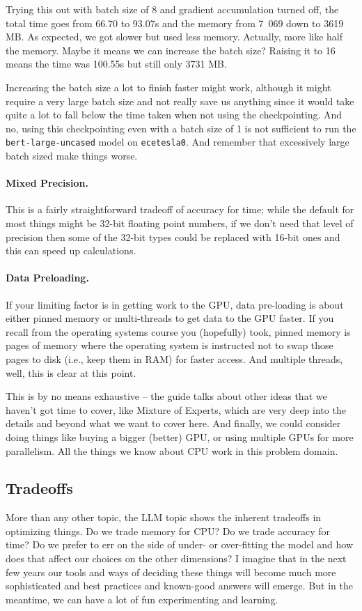 Trying this out with batch size of 8 and gradient accumulation turned off, the total time goes from 66.70 to 93.07s and the memory from 7~069 down to 3619 MB. As expected, we got slower but used less memory. Actually, more like half the memory. Maybe it means we can increase the batch size? Raising it to 16 means the time was  100.55s but still only 3731 MB.

Increasing the batch size a lot to finish faster might work, although it might require a very large batch size and not really save us anything since it would take quite a lot to fall below the time taken when not using the checkpointing. And no, using this checkpointing even with a batch size of 1 is not sufficient to run the \texttt{bert-large-uncased} model on \texttt{ecetesla0}. And remember that excessively large batch sized make things worse.

\paragraph{Mixed Precision.} This is a fairly straightforward tradeoff of accuracy for time; while the default for most things might be 32-bit floating point numbers, if we don't need that level of precision then some of the 32-bit types could be replaced with 16-bit ones and this can speed up calculations. 

\paragraph{Data Preloading.} If your limiting factor is in getting work to the GPU, data pre-loading is about either pinned memory or multi-threads to get data to the GPU faster. If you recall from the operating systems course you (hopefully) took, pinned memory is pages of memory where the operating system is instructed not to swap those pages to disk (i.e., keep them in RAM) for faster access. And multiple threads, well, this is clear at this point. 

This is by no means exhaustive -- the guide talks about other ideas that we haven't got time to cover, like Mixture of Experts, which are very deep into the details and beyond what we want to cover here. And finally, we could consider doing things like buying a bigger (better) GPU, or using multiple GPUs for more parallelism. All the things we know about CPU work in this problem domain. 

\subsection*{Tradeoffs}

More than any other topic, the LLM topic shows the inherent tradeoffs in optimizing things. Do we trade memory for CPU? Do we trade accuracy for time? Do we prefer to err on the side of under- or over-fitting the model and how does that affect our choices on the other dimensions? I imagine that in the next few years our tools and ways of deciding these things will become much more sophisticated and best practices and known-good answers will emerge. But in the meantime, we can have a lot of fun experimenting and learning.






